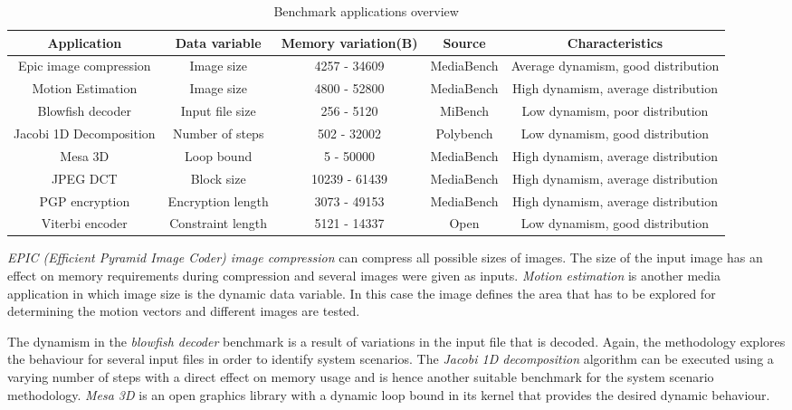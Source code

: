 \documentclass{acm_proc_article-sp}
\begin{document}
\begin{center}
\begin{table*}[!t]
\caption{Benchmark applications overview}
\label{tab:applications}
{\small
\hfill{}
\begin{tabular}{|c|c|c|c|c|}
\hline 
\textbf{Application} & \textbf{Data variable} & \textbf{Memory variation(B)} & \textbf{Source} & \textbf{Characteristics}\\ 
\hline 
Epic image compression & Image size & 4257 - 34609 & MediaBench & Average dynamism, good distribution\\ 
\hline 
Motion Estimation & Image size & 4800 - 52800 & MediaBench & High dynamism, average distribution\\ 
\hline 
Blowfish decoder & Input file size & 256 - 5120 & MiBench & Low dynamism, poor distribution\\ 
\hline 
Jacobi 1D Decomposition & Number of steps & 502 - 32002 & Polybench & Low dynamism, good distribution\\ 
\hline 
Mesa 3D & Loop bound & 5 - 50000 & MediaBench & High dynamism, average distribution\\ 
\hline 
JPEG DCT & Block size & 10239 - 61439 & MediaBench & High dynamism, average distribution\\ 
\hline 
PGP encryption & Encryption length & 3073 - 49153 & MediaBench & High dynamism, average distribution\\ 
\hline 
Viterbi encoder & Constraint length & 5121 - 14337 & Open & Low dynamism, good distribution\\ 
\hline 
\end{tabular}}
\end{table*}
\end{center}

\textit{EPIC (Efficient Pyramid Image Coder) image compression} can compress all possible sizes of images. The size of the input image has an effect on memory requirements during compression and several images were given as inputs. \textit{Motion estimation} is another media application in which image size is the dynamic data variable. In this case the image defines the area that has to be explored for determining the motion vectors and different images are tested.

The dynamism in the \textit{blowfish decoder} benchmark is a result of variations in the input file that is decoded. Again, the methodology explores the behaviour for several input files in order to identify system scenarios. The \textit{Jacobi 1D decomposition} algorithm can be executed using a varying number of steps with a direct effect on memory usage and is hence another suitable benchmark for the system scenario methodology. \textit{Mesa 3D} is an open graphics library with a dynamic loop bound in its kernel that provides the desired dynamic behaviour. 
\end{document}
